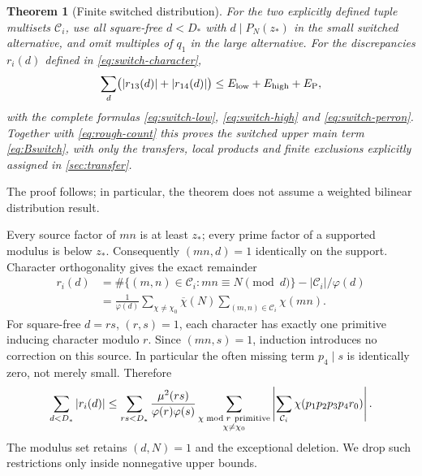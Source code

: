 \documentclass[11pt]{article}
\newtheorem{theorem}{Theorem}[section]
\theoremstyle{definition}
\begin{document}
\begin{theorem}[Finite switched distribution]\label{thm:switch}
For the two explicitly defined tuple multisets $\mathcal C_i$, use
all square-free $d<D_*$ with $d\mid P_N(z_*)$ in the small switched
alternative, and omit multiples of $q_1$ in the large alternative.
For the discrepancies $r_i(d)$ defined in \eqref{eq:switch-character},
\[
 \sum_d\bigl(|r_{13}(d)|+|r_{14}(d)|\bigr)
 \le E_{\rm low}+E_{\rm high}+E_{\rm P},
\]
with the complete formulas \eqref{eq:switch-low},
\eqref{eq:switch-high} and \eqref{eq:switch-perron}.
Together with \eqref{eq:rough-count} this proves the switched upper
main term \eqref{eq:Bswitch}, with only the transfers, local products
and finite exclusions explicitly assigned in \cref{sec:transfer}.
\end{theorem}
The proof follows; in particular, the theorem does not assume a
weighted bilinear distribution result.

Every source factor of $mn$ is at least $z_*$; every prime factor of a
supported modulus is below $z_*$.  Consequently $(mn,d)=1$
identically on the support.  Character orthogonality gives the exact
remainder
\begin{equation}\label{eq:switch-character}
\begin{split}
 r_i(d)&=\#\{(m,n)\in\mathcal C_i:mn\equiv N\pmod d\}
                         -|\mathcal C_i|/\varphi(d)\\
 &=\frac1{\varphi(d)}\sum_{\chi\ne\chi_0}\overline{\chi}(N)
                    \sum_{(m,n)\in\mathcal C_i}\chi(mn).
\end{split}
\end{equation}
For square-free $d=rs$, $(r,s)=1$, each character has exactly one
primitive inducing character modulo $r$.  Since $(mn,s)=1$,
induction introduces no correction on this source.  In particular
the often missing term $p_4\mid s$ is identically zero, not merely
small.  Therefore
\begin{equation}\label{eq:switch-primitive}
 \sum_{d<D_*}|r_i(d)|
 \le\sum_{rs<D_*}\frac{\mu^2(rs)}{\varphi(r)\varphi(s)}
       \sum_{\substack{\chi\bmod r\ {\rm primitive}\\\chi\ne\chi_0}}
       \left|\sum_{\mathcal C_i}\chi(p_1p_2p_3p_4r_0)\right|.
\end{equation}
The modulus set retains $(d,N)=1$ and the exceptional deletion.
We drop such restrictions only inside nonnegative upper bounds.
\end{document}

